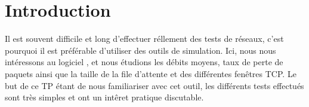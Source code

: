 
\section{Introduction}
Il est souvent difficile et long d'effectuer r\'ellement des tests de r\'eseaux, c'est
pourquoi il est pr\'ef\'erable d'utiliser des outils de simulation.
Ici, nous nous int\'eressons au logiciel \ns, et nous \'etudions les d\'ebits moyens,
taux de perte de paquets ainsi que la taille de la file d'attente et des différentes fenêtres TCP.
Le but de ce TP \'etant de nous familiariser avec cet outil, les diff\'erents tests
effectu\'es sont tr\`es simples et ont un int\^eret pratique discutable.


